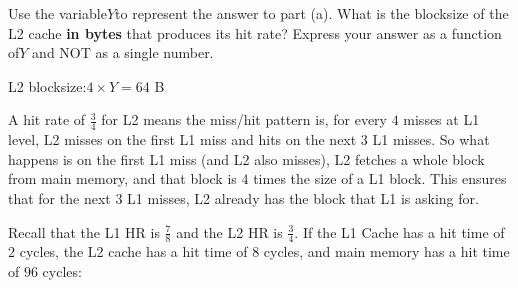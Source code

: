 \begin{blocksection}
\question
Use the variable ​$Y$​ to represent the answer to part (a). What is the blocksize of the L2 cache ​\textbf{in bytes}​ that produces its hit rate? Express your answer as a function of ​$Y​$ and NOT as a single number.

\begin{solution}[0.7in]
L2 blocksize: ​$4 \times Y = 64$ B

A hit rate of $\frac{3}{4}$ for L2 means the miss/hit pattern is, for every $4$ misses at L1 level, L2 misses on the first L1 miss and hits on the next $3$ L1 misses. So what happens is on the first L1 miss (and L2 also misses), L2 fetches a whole block from main memory, and that block is $4$ times the size of a L1 block. This ensures that for the next $3$ L1 misses, L2 already has the block that L1 is asking for.
\end{solution}

Recall that the L1 HR is $\frac{7}{8}$ and the L2 HR is $\frac{3}{4}$. If the L1 Cache has a hit time of $2$ cycles, the L2 cache has a hit time of $8$ cycles, and main memory has a hit time of $96$ cycles:
\end{blocksection}